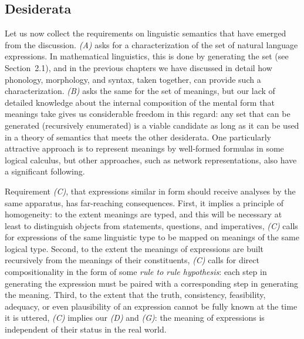 \subsection{Desiderata}

Let us now collect the requirements on linguistic semantics that have
emerged from the discussion. {\sl (A)} asks for a characterization of
the set of natural language expressions. In mathematical linguistics, this is
done by generating the set (see Section~2.1), and in the previous chapters we
have discussed in detail how phonology, morphology, and syntax, taken
together, can provide such a characterization. {\sl (B)} asks the same for the
set of meanings, but our lack of detailed knowledge about the internal
composition of the mental form that meanings take gives us considerable
freedom in this regard: any set that can be generated (recursively enumerated)
is a viable candidate as long as it can be used in a theory of semantics that
meets the other desiderata.  One particularly attractive approach is to
represent meanings by well-formed formulas in some logical calculus, but other
approaches, such as network representations, also have a significant following.

Requirement {\sl (C)}, that expressions similar in form should receive
analyses by the same apparatus, has far-reaching consequences. First, it
implies a principle of homogeneity: to the extent meanings are typed, and this
will be necessary at least to distinguish objects from statements, questions,
and imperatives, {\sl (C)} calls for expressions of the same linguistic type
to be mapped on meanings of the same logical type. Second, to the extent the
meanings of expressions are built recursively from the meanings of their
constituents, {\sl (C)} calls for direct compositionality in the form of some
{\it rule to rule hypothesis}:
 each step in generating the expression must be paired
with a corresponding step in generating the meaning. Third, to the extent that
the truth, consistency, feasibility, adequacy, or even plausibility of an
expression cannot be fully known at the time it is uttered, {\sl (C)} implies
our {\sl (D)} and {\sl (G)}: the meaning of expressions is independent of
their status in the real world.

